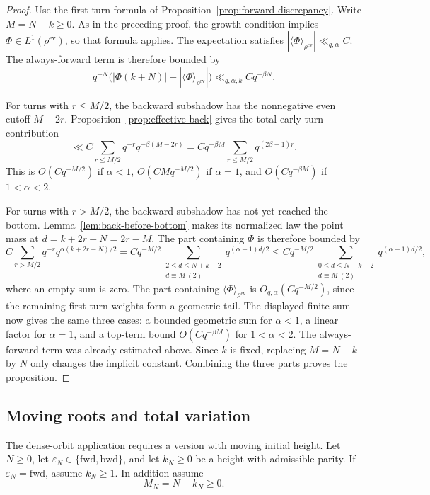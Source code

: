\documentclass[11pt]{amsart}
\theoremstyle{definition}
\theoremstyle{plain}
\newcommand{\fwd}{\mathrm{fwd}}
\newcommand{\bwd}{\mathrm{bwd}}
\newcommand{\ev}{\mathrm{ev}}
\newcommand{\ang}{\langle}
\newcommand{\rang}{\rangle}
\begin{document}
\begin{proof}
Use the first-turn formula of Proposition~\ref{prop:forward-discrepancy}.  Write
\(M=N-k\ge0\).  As in the preceding proof, the growth condition implies
\(\Phi\in L^1(\rho^{\ev})\), so that formula applies.  The expectation satisfies
\(|\ang\Phi\rang_{\rho^{\ev}}|\ll_{q,\alpha}C\).  The always-forward term is
therefore bounded by
\[
q^{-N}\bigl(|\Phi(k+N)|+|\ang\Phi\rang_{\rho^{\ev}}|\bigr)
 \ll_{q,\alpha,k} Cq^{-\beta N}.
\]

For turns with \(r\le M/2\), the backward subshadow has the nonnegative even
cutoff \(M-2r\).  Proposition~\ref{prop:effective-back} gives the total
early-turn contribution
\[
\ll C\sum_{r\le M/2}q^{-r}q^{-\beta(M-2r)}
= Cq^{-\beta M}\sum_{r\le M/2}q^{(2\beta-1)r}.
\]
This is \(O(Cq^{-M/2})\) if \(\alpha<1\), \(O(CMq^{-M/2})\) if \(\alpha=1\), and
\(O(Cq^{-\beta M})\) if \(1<\alpha<2\).

For turns with \(r>M/2\), the backward subshadow has not yet reached the
bottom.  Lemma~\ref{lem:back-before-bottom} makes its normalized law the point
mass at \(d=k+2r-N=2r-M\).  The part containing \(\Phi\) is therefore bounded
by
\[
C\sum_{r>M/2}q^{-r}q^{\alpha(k+2r-N)/2}
 = Cq^{-M/2}
  \sum_{\substack{2\le d\le N+k-2\\ d\equiv M\ (2)}}
  q^{(\alpha-1)d/2}
 \le Cq^{-M/2}
  \sum_{\substack{0\le d\le N+k-2\\ d\equiv M\ (2)}}
  q^{(\alpha-1)d/2},
\]
where an empty sum is zero.  The part
containing \(\ang\Phi\rang_{\rho^{\ev}}\) is
\(O_{q,\alpha}(Cq^{-M/2})\), since the remaining first-turn weights form a
geometric tail.  The displayed finite sum now gives the same three cases: a
bounded geometric sum for \(\alpha<1\), a linear factor for \(\alpha=1\), and a
top-term bound \(O(Cq^{-\beta M})\) for \(1<\alpha<2\).  The always-forward
term was already estimated above.  Since \(k\) is fixed, replacing
\(M=N-k\) by \(N\) only changes the implicit constant.  Combining the three
parts proves the proposition.
\end{proof}

\subsection{Moving roots and total variation}
The dense-orbit application requires a version with moving initial height.  Let
\(N\ge0\), let \(\varepsilon_N\in\{\fwd,\bwd\}\), and let \(k_N\ge0\) be a
height with admissible parity.  If \(\varepsilon_N=\fwd\), assume
\(k_N\ge1\).  In addition assume
\[
M_N=N-k_N\ge0.
\]
\end{document}
